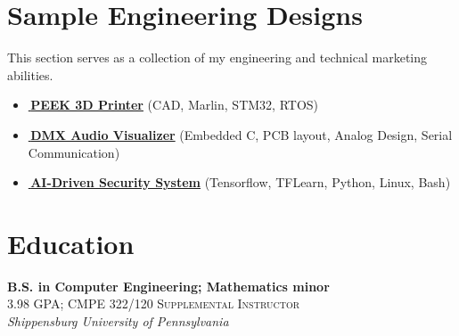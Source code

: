\documentclass[
	12pt, %
]{FreemanCV}
\begin{document}
\section{Sample Engineering Designs}
{
	This section serves as a collection of my engineering and technical marketing abilities.
	\vspace*{-7pt}
	\begin{itemize}[leftmargin=10pt]
		\itemsep-5pt
		\item \href{https://github.com/jfcbooth/3dpp}{\linkcolor\scriptsize\faLink\normalcolor\normalsize\,\textbf{PEEK 3D Printer}} (CAD, Marlin, STM32, RTOS)
		\item \href{https://github.com/microchip-pic-avr-examples/pic16f56q71-audio-light-show-mplab-mcc}{\linkcolor\scriptsize\faLink\normalcolor\normalsize\,\textbf{DMX Audio Visualizer}} (Embedded C, PCB layout, Analog Design, Serial Communication)
		\item \href{https://github.com/jfcbooth/security_system}{\linkcolor\scriptsize\faLink\normalcolor\normalsize\,\textbf{AI-Driven Security System}} (Tensorflow, TFLearn, Python, Linux, Bash)
	\end{itemize}
}

\section{Education}
	\textbf{B.S. in Computer Engineering; Mathematics minor}\\ %
	\small\textsc{3.98 GPA; CMPE 322/120 Supplemental Instructor}\\ %
	\textit{Shippensburg University of Pennsylvania}\\ %


\vfill
\vspace{1cm}
\end{document}
